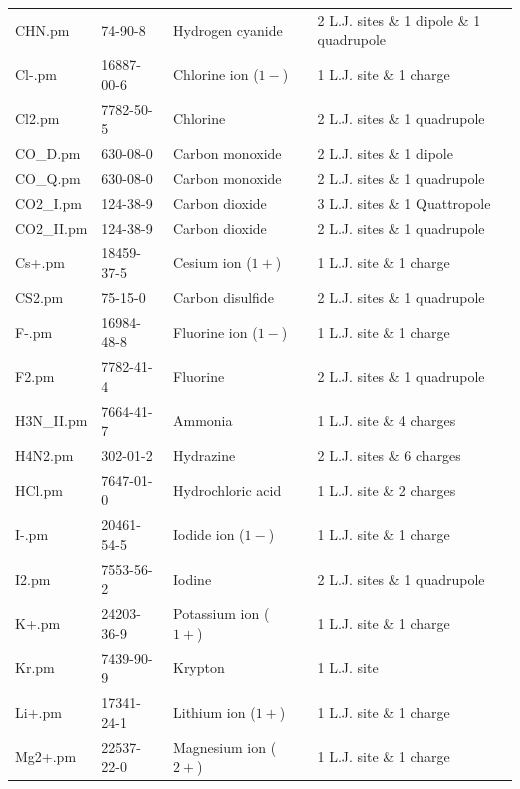 \begin{landscape}
\begin{longtable}{lllll}
	CHN.pm & 74-90-8 & Hydrogen cyanide & \parencite{Eckl2008_C} & 2 L.J. sites \& 1 dipole \& 1 quadrupole \\
	Cl-.pm & 16887-00-6 & Chlorine ion ($1-$) & \parencite{Reiser2014} & 1 L.J. site \& 1 charge \\
	Cl2.pm & 7782-50-5 & Chlorine  & \parencite{Vrabec2001} & 2 L.J. sites \& 1 quadrupole \\
	CO\_D.pm & 630-08-0 & Carbon monoxide & \parencite{Stoll2003} & 2 L.J. sites \& 1 dipole  \\
	CO\_Q.pm & 630-08-0 & Carbon monoxide & \parencite{Stoll2004} & 2 L.J. sites \& 1 quadrupole \\
	CO2\_I.pm & 124-38-9 & Carbon dioxide & \parencite{Merker2010} & 3 L.J. sites \& 1 Quattropole \\
	CO2\_II.pm & 124-38-9 & Carbon dioxide & \parencite{Stoll2004} & 2 L.J. sites \& 1 quadrupole \\
	Cs+.pm & 18459-37-5 & Cesium ion ($1+$) & \parencite{Reiser2014} & 1 L.J. site \& 1 charge \\
	CS2.pm & 75-15-0 & Carbon disulfide & \parencite{Vrabec2001} & 2 L.J. sites \& 1 quadrupole \\
	F-.pm & 16984-48-8 & Fluorine ion ($1-$) & \parencite{Reiser2014} & 1 L.J. site \& 1 charge \\
	F2.pm & 7782-41-4 & Fluorine & \parencite{Vrabec2001} & 2 L.J. sites \& 1 quadrupole \\
	H3N\_II.pm & 7664-41-7 & Ammonia & \parencite{Eckl2008_B} & 1 L.J. site \& 4 charges \\
	H4N2.pm & 302-01-2 & Hydrazine & \parencite{Elts2012} & 2 L.J. sites \& 6 charges \\
	HCl.pm & 7647-01-0 & Hydrochloric acid & \parencite{Huang2011} & 1 L.J. site \& 2 charges \\
	I-.pm & 20461-54-5 & Iodide ion ($1-$) & \parencite{Reiser2014} & 1 L.J. site \& 1 charge \\
	I2.pm & 7553-56-2 & Iodine & \parencite{Vrabec2001} & 2 L.J. sites \& 1 quadrupole \\
	K+.pm & 24203-36-9 & Potassium ion ($1+$) & \parencite{Reiser2014} & 1 L.J. site \& 1 charge \\
	Kr.pm & 7439-90-9 & Krypton & \parencite{Vrabec2001} & 1 L.J. site \\
	Li+.pm & 17341-24-1 & Lithium ion ($1+$) & \parencite{Reiser2014} & 1 L.J. site \& 1 charge \\
	Mg2+.pm & 22537-22-0 & Magnesium ion ($2+$) & \parencite{Deublein2012_A} & 1 L.J. site \& 1 charge \\

\end{longtable}
\end{landscape}
